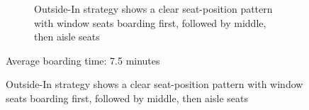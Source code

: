 \documentclass[landscape]{article}
\begin{document}
\begin{figure}
\begin{subfigure}{\textwidth}
        \caption{Outside-In strategy shows a clear seat-position pattern with window seats boarding first, followed by middle, then aisle seats}
    \end{subfigure}
    
    \vspace{-0.5cm}
    \begin{center}
        Average boarding time: 7.5 minutes
    \end{center}
\end{figure}

\clearpage
\end{document}
